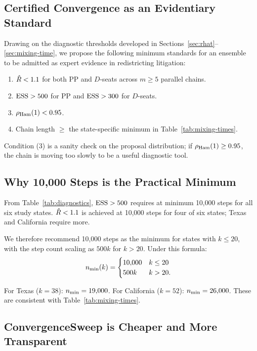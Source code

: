 \subsection{Certified Convergence as an Evidentiary Standard}

Drawing on the diagnostic thresholds developed in Sections~\ref{sec:rhat}--\ref{sec:mixing-time},
we propose the following minimum standards for an ensemble to be admitted
as expert evidence in redistricting litigation:

\begin{enumerate}
\item $\hat{R} < 1.1$ for both PP and $D$-seats across $m \geq 5$ parallel chains.
\item $\mathrm{ESS} > 500$ for PP and $\mathrm{ESS} > 300$ for $D$-seats.
\item $\rho_{\mathrm{Ham}}(1) < 0.95$.
\item Chain length $\geq$ the state-specific minimum in Table~\ref{tab:mixing-times}.
\end{enumerate}

Condition (3) is a sanity check on the proposal distribution; if
$\rho_{\mathrm{Ham}}(1) \geq 0.95$, the chain is moving too slowly to be a useful
diagnostic tool.

\subsection{Why 10{,}000 Steps is the Practical Minimum}

From Table~\ref{tab:diagnostics}, $\mathrm{ESS} > 500$ requires at minimum
10{,}000 steps for all six study states.
$\hat{R} < 1.1$ is achieved at 10{,}000 steps for four of six states;
Texas and California require more.

We therefore recommend 10{,}000 steps as the minimum for states with
$k \leq 20$, with the step count scaling as $500 k$ for $k > 20$.
Under this formula:
\[
  n_{\rm min}(k) = \begin{cases} 10{,}000 & k \leq 20 \\ 500k & k > 20. \end{cases}
\]

For Texas ($k = 38$): $n_{\rm min} = 19{,}000$.
For California ($k = 52$): $n_{\rm min} = 26{,}000$.
These are consistent with Table~\ref{tab:mixing-times}.

\subsection{ConvergenceSweep is Cheaper and More Transparent}

